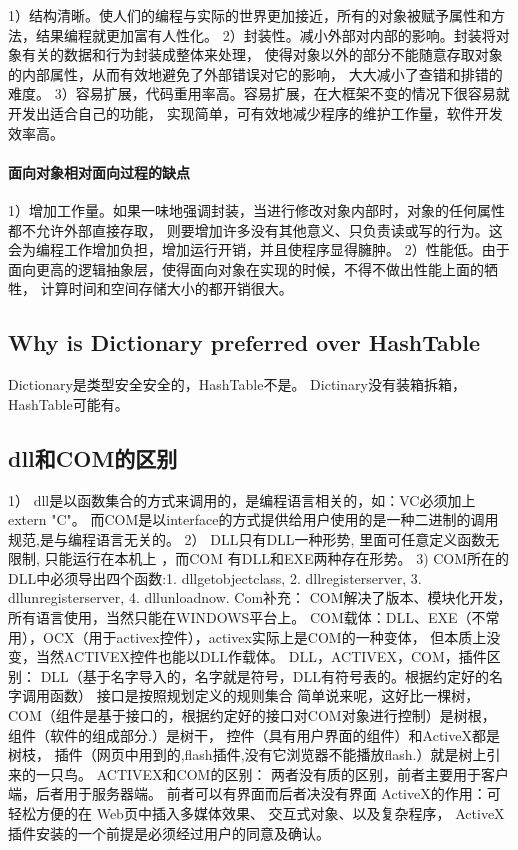 \documentclass{book}
\begin{document}
1）结构清晰。使人们的编程与实际的世界更加接近，所有的对象被赋予属性和方法，结果编程就更加富有人性化。
2）封装性。减小外部对内部的影响。封装将对象有关的数据和行为封装成整体来处理，
使得对象以外的部分不能随意存取对象的内部属性，从而有效地避免了外部错误对它的影响，
大大减小了查错和排错的难度。
3）容易扩展，代码重用率高。容易扩展，在大框架不变的情况下很容易就开发出适合自己的功能，
实现简单，可有效地减少程序的维护工作量，软件开发效率高。

\paragraph{面向对象相对面向过程的缺点}

1）增加工作量。如果一味地强调封装，当进行修改对象内部时，对象的任何属性都不允许外部直接存取，
则要增加许多没有其他意义、只负责读或写的行为。这会为编程工作增加负担，增加运行开销，并且使程序显得臃肿。
2）性能低。由于面向更高的逻辑抽象层，使得面向对象在实现的时候，不得不做出性能上面的牺牲，
计算时间和空间存储大小的都开销很大。

\subsection{Why is Dictionary preferred over HashTable}


Dictionary是类型安全安全的，HashTable不是。
Dictinary没有装箱拆箱，HashTable可能有。

\subsection{dll和COM的区别}

1） dll是以函数集合的方式来调用的，是编程语言相关的，如：VC必须加上extern "C"。
而COM是以interface的方式提供给用户使用的是一种二进制的调用规范,是与编程语言无关的。
2） DLL只有DLL一种形势, 里面可任意定义函数无限制, 只能运行在本机上 ，而COM
有DLL和EXE两种存在形势。
3) COM所在的DLL中必须导出四个函数:1. dllgetobjectclass, 2. dllregisterserver, 
3. dllunregisterserver, 4. dllunloadnow.
Com补充：
COM解决了版本、模块化开发，所有语言使用，当然只能在WINDOWS平台上。
COM载体：DLL、EXE（不常用），OCX（用于activex控件），activex实际上是COM的一种变体，
但本质上没变，当然ACTIVEX控件也能以DLL作载体。
DLL，ACTIVEX，COM，插件区别：
DLL（基于名字导入的，名字就是符号，DLL有符号表的。根据约定好的名字调用函数）
接口是按照规划定义的规则集合
简单说来呢，这好比一棵树，
COM（组件是基于接口的，根据约定好的接口对COM对象进行控制）是树根，
组件（软件的组成部分.）是树干，
控件（具有用户界面的组件）和ActiveX都是树枝，
插件（网页中用到的,flash插件,没有它浏览器不能播放flash.）就是树上引来的一只鸟。
ACTIVEX和COM的区别：
两者没有质的区别，前者主要用于客户端，后者用于服务器端。
前者可以有界面而后者决没有界面
ActiveX的作用：可轻松方便的在 Web页中插入多媒体效果、 交互式对象、以及复杂程序， 
ActiveX插件安装的一个前提是必须经过用户的同意及确认。
\end{document}
